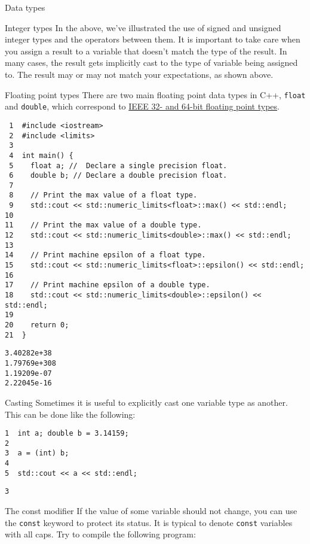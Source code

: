 \documentclass[presentation]{beamer}
\begin{document}
\begin{frame}[fragile,label={sec:orgheadline3}]{Data types}
\begin{block}{Integer types}
In the above, we've illustrated the use of signed and unsigned 
integer types and the operators between them. It is important to 
take care when you assign a result to a variable that doesn't match 
the type of the result. In many cases, the result gets implicitly 
cast to the type of variable being assigned to. The result may or 
may not match your expectations, as shown above.
\end{block}

\begin{block}{Floating point types}
There are two main floating point data types in C++, \texttt{float} and \texttt{double},
which correspond to \href{https://en.wikipedia.org/wiki/IEEE_floating_point}{IEEE 32- and 64-bit floating point types}. 

\begin{verbatim}
 1  #include <iostream>
 2  #include <limits>
 3  
 4  int main() {
 5    float a; //  Declare a single precision float.
 6    double b; // Declare a double precision float.
 7  
 8    // Print the max value of a float type.
 9    std::cout << std::numeric_limits<float>::max() << std::endl;
10  
11    // Print the max value of a double type.
12    std::cout << std::numeric_limits<double>::max() << std::endl;
13  
14    // Print machine epsilon of a float type.
15    std::cout << std::numeric_limits<float>::epsilon() << std::endl;
16  
17    // Print machine epsilon of a double type.
18    std::cout << std::numeric_limits<double>::epsilon() << std::endl;
19  
20    return 0;
21  }
\end{verbatim}

\begin{verbatim}
3.40282e+38
1.79769e+308
1.19209e-07
2.22045e-16
\end{verbatim}
\end{block}


\begin{block}{Casting}
Sometimes it is useful to explicitly cast one variable type as another. 
This can be done like the following:

\begin{verbatim}
1  int a; double b = 3.14159;
2  
3  a = (int) b;
4  
5  std::cout << a << std::endl;
\end{verbatim}

\begin{verbatim}
3
\end{verbatim}
\end{block}

\begin{block}{The const modifier}
If the value of some variable should not change, you can use the \texttt{const}
keyword to protect its status. It is typical to denote \texttt{const} variables 
with all caps. Try to compile the following program:


\end{block}
\end{frame}
\end{document}
